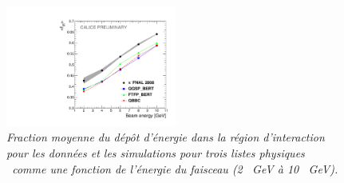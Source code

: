 \begin{figure}
	\centering
	\includegraphics[width=0.5\textwidth]{ECAL/plots/e-ir-graph.pdf}
	\caption{\label{fig:irgraphF} \sl  Fraction moyenne du dépôt d'énergie dans la région d'interaction pour les données et les simulations  pour trois listes physiques \geant\ comme une fonction de l'énergie du faisceau (2 \, GeV à 10 \, GeV).}
\end{figure}

